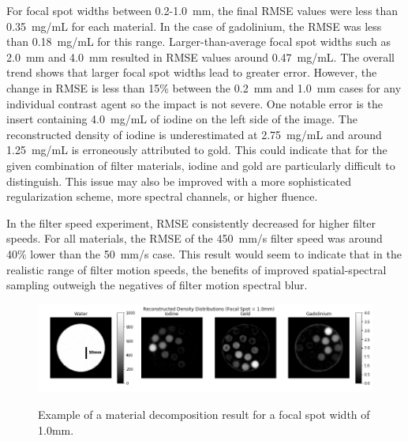 \documentclass[]{spie}  %
\begin{document}
For focal spot widths between 0.2-1.0~mm, the final RMSE values were less than 0.35~mg/mL for each material. In the case of gadolinium, the RMSE was less than 0.18~mg/mL for this range. Larger-than-average focal spot widths such as 2.0~mm and 4.0~mm resulted in RMSE values around 0.47~mg/mL. The overall trend shows that larger focal spot widths lead to greater error. However, the change in RMSE is less than 15\% between the 0.2~mm and 1.0~mm cases for any individual contrast agent so the impact is not severe. One notable error is the insert containing 4.0~mg/mL of iodine on the left side of the image. The reconstructed density of iodine is underestimated at 2.75~mg/mL and around 1.25~mg/mL is erroneously attributed to gold. This could indicate that for the given combination of filter materials, iodine and gold are particularly difficult to distinguish. This issue may also be improved with a more sophisticated regularization scheme, more spectral channels, or higher fluence.

In the filter speed experiment, RMSE consistently decreased for higher filter speeds. For all materials, the RMSE of the 450~mm/s filter speed was around 40\% lower than the 50~mm/s case. This result would seem to indicate that in the realistic range of filter motion speeds, the benefits of improved spatial-spectral sampling outweigh the negatives of filter motion spectral blur.

\begin{figure}
	\centering
	\includegraphics[width=0.99\linewidth]{figures/recon_image_FSW_1000}
  	\label{fig:sub1}
	\caption{Example of a material decomposition result for a focal spot width of 1.0mm.}
\label{fig:reconExample}
\end{figure}

\end{document}

